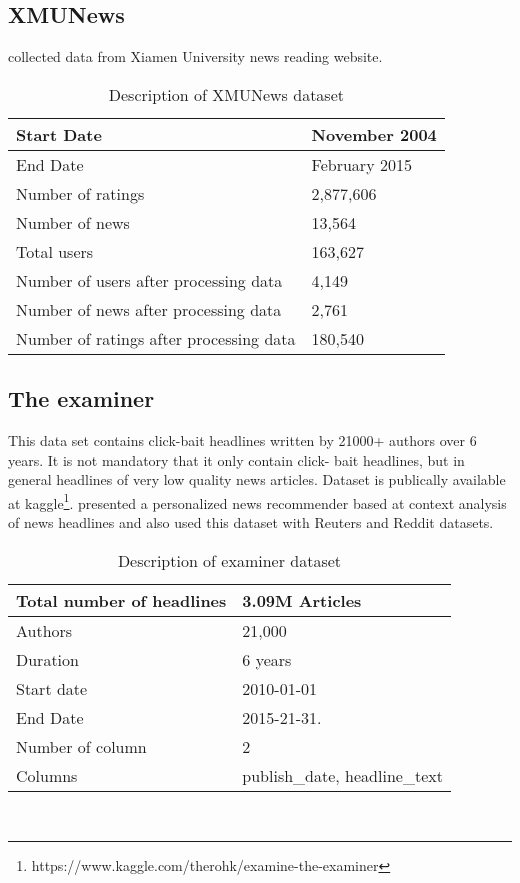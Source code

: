 \subsection{XMUNews}
\cite{p4-3} collected data from Xiamen University news reading website. 
\\
\begin{table}[!htbp] 
\centering
\footnotesize
\def\arraystretch{1.4}%
\centering
\begin{tabular}{|p{7cm}|p{3cm}|}
\hline
Start Date & November
2004
\\
\hline 
End Date & February 2015
\\
\hline 
Number of ratings & 2,877,606
\\
\hline 
Number of news & 13,564
\\
\hline 
Total users & 163,627
\\
\hline 
Number of users after processing data& 4,149
\\
\hline 
Number of news after processing data & 2,761
\\
\hline 
Number of ratings after processing data & 180,540
\\
\hline
\end{tabular}

\caption{Description of XMUNews dataset}
\label{table:6}
\end{table}
\subsection{The examiner}
This data set contains click-bait headlines written by 21000+ authors over 6 years. It is not mandatory that it only contain click- bait headlines, but in general headlines of very low quality news articles. Dataset is publically available at kaggle\footnote{https://www.kaggle.com/therohk/examine-the-examiner}. \cite{N10} presented a personalized news recommender based at context analysis of news headlines and also used this dataset with Reuters and Reddit datasets. 
\\
\begin{table}[!htbp] 
\centering
\footnotesize
\def\arraystretch{1.4}%
\centering
\begin{tabular}{|p{7cm}|p{3cm}|}
\hline
Total number of headlines & 3.09M Articles
\\
\hline 
Authors & 21,000
\\
\hline 
Duration & 6 years 
\\
\hline 
Start date & 2010-01-01
\\
\hline
End Date & 2015-21-31.
\\
\hline
Number of column & 2
\\
\hline 
Columns & publish\_date, headline\_text
\\
\hline
\end{tabular}

\caption{Description of examiner dataset}
\label{table:9}
\end{table}
\\
